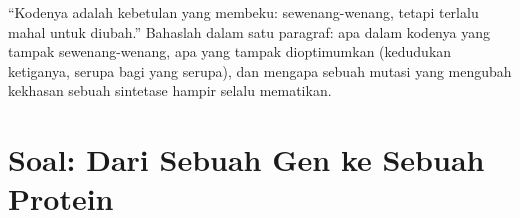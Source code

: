 \begin{exercise}[$\star\star\star$]\label{exo:b1:gene-expression:12}
``Kodenya adalah kebetulan yang membeku: sewenang-wenang, tetapi terlalu
mahal untuk diubah.'' Bahaslah dalam satu paragraf: apa dalam kodenya
yang tampak sewenang-wenang, apa yang tampak dioptimumkan (kedudukan
ketiganya,  serupa bagi  yang serupa), dan mengapa
sebuah mutasi yang mengubah kekhasan sebuah sintetase hampir selalu
mematikan.
\end{exercise}

\section{Soal: Dari Sebuah Gen ke Sebuah Protein}

